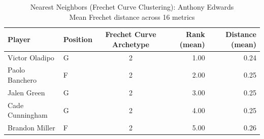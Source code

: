 \begin{table}[t]
\caption*{
{\fontsize{20}{25} Nearest Neighbors (Frechet Curve Clustering): Anthony Edwards\fontsize{12}{15}\selectfont } \\ 
{\fontsize{14}{17}\selectfont  Mean Frechet distance across 16 metrics\fontsize{12}{15}\selectfont }
} 
\fontsize{12.0pt}{14.0pt}\selectfont
\begin{tabular*}{\linewidth}{@{\extracolsep{\fill}}llcrr}
\toprule
Player & Position & Frechet Curve Archetype & Rank (mean) & Distance (mean) \\ 
\midrule\addlinespace[2.5pt]
Victor Oladipo & G & 2 & 1.00 & 0.24 \\ 
Paolo Banchero & F & 2 & 2.00 & 0.25 \\ 
Jalen Green & G & 2 & 3.00 & 0.25 \\ 
Cade Cunningham & G & 2 & 4.00 & 0.25 \\ 
Brandon Miller & F & 2 & 5.00 & 0.26 \\ 
\bottomrule
\end{tabular*}
\end{table}

